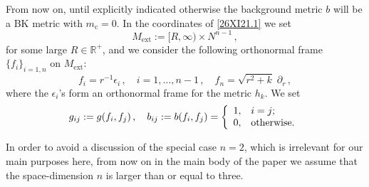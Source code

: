 \documentclass[a4paper,10pt]{article}
\newcommand{\Nk}{\red{N^{n-1}}}
\newcommand{\hk}{\red{h_{k}}}
\newcommand{\HMext}{\red{ {M_\ext}}}
\newcommand{\red}[1]{{\color{red}#1}}
\newcommand{\mc}{\red{m_{\mathrm c}}}
\newcommand{\be}{\begin{equation}}
\newcommand{\ee}{\end{equation}}
\newcommand{\R}{\mathbb R}
\newcommand{\ext}{\mathrm{ext}}
\renewcommand{\red}[1]{#1}%
\begin{document}
     From now on, until explicitly indicated otherwise the background metric  $b$ will be a BK metric with $\mc=0$.
      In the coordinates of
     \eqref{26XI21.1} we set
     \begin{equation}\label{3VII21.2}
     \HMext := [R,\infty)\times \Nk
      \,,
     \end{equation}
     for some large $R\in \R^+$, and we consider the following orthonormal frame
     $\{f_i\}_{i=1,n}$ on $\HMext$:
     \be\label{m1}  f_i = r^{-1}\epsilon_i\,, \quad
     i=1,\ldots,n-1\,,\quad
      f_n = \sqrt{r^2+k} \;\partial_r\,, \ee
     where the $\epsilon_i$'s form an orthonormal frame for the metric $\hk $. We
     set
     \be \label{m2} g_{ij}:=g(f_i,f_j)
      \,,
      \quad b_{ij}:=b(f_i,f_j)
      = \left\{
          \begin{array}{ll}
            1, & \hbox{$i=j$;} \\
            0, & \hbox{otherwise.}
          \end{array}
        \right.
     \ee

 In order to avoid a discussion of the special case $n=2$, which is irrelevant for our main purposes here, from now on  in the main body of the paper  we assume that the space-dimension $n$ is larger than or equal to three.
\end{document}
